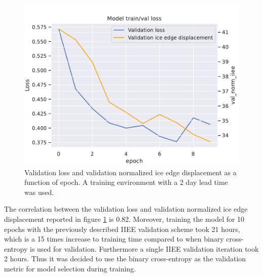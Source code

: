 \documentclass[../main/thesis]{subfiles}
\begin{document}
\begin{figure}
    \centering
    \includegraphics[width=\textwidth]{val_loss_iiee}
    \caption{\label{fig:val_loss_iiee}Validation loss and validation normalized ice edge displacement as a function of epoch. A training environment with a 2 day lead time was used.}
\end{figure}

The correlation between the validation loss and validation normalized ice edge displacement reported in figure \ref{fig:val_loss_iiee} is 0.82. Moreover, training the model for 10 epochs with the previously described IIEE validation scheme took 21 hours, which is a 15 times increase to training time compared to when binary cross-entropy is used for validation. Furthermore a single IIEE validation iteration took 2 hours. Thus it was decided to use the binary cross-entropy as the validation metric for model selection during training.

\biblio
\end{document}
